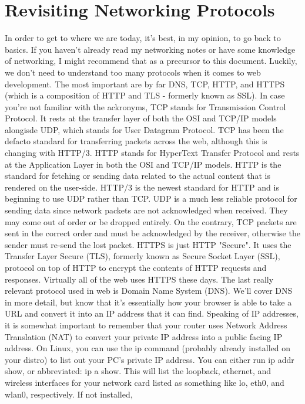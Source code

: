 \documentclass{article}
\begin{document}
\section{Revisiting Networking Protocols}

In order to get to where we are today, it's best, in my opinion, to go back to basics. If you haven't already
read my networking notes or have some knowledge of networking, I might recommend that as a precursor to this
document. Luckily, we don't need to understand too many protocols when it comes to web development. The most
important are by far DNS, TCP, HTTP, and HTTPS (which is a composition of HTTP and TLS - formerly known as SSL).
In case you're not familiar with the ackronyms, TCP stands for Transmission Control Protocol. It rests at the
transfer layer of both the OSI and TCP/IP models alongisde UDP, which stands for User Datagram Protocol. TCP
has been the defacto standard for transferring packets across the web, although this is changing with HTTP/3.
HTTP stands for HyperText Transfer Protocol and rests at the Application Layer in both the OSI and TCP/IP
models. HTTP is the standard for fetching or sending data related to the actual content that is rendered on the
user-side. HTTP/3 is the newest standard for HTTP and is beginning to use UDP rather than TCP. UDP is a much
less reliable protocol for sending data since network packets are not acknowledged when received. They may come
out of order or be dropped entirely. On the contrary, TCP packets are sent in the correct order and must be
acknowledged by the receiver, otherwise the sender must re-send the lost packet. HTTPS is just HTTP "Secure".
It uses the Transfer Layer Secure (TLS), formerly known as Secure Socket Layer (SSL), protocol on top of HTTP
to encrypt the contents of HTTP requests and responses. Virtually all of the web uses HTTPS these days. The
last really relevant protocol used in web is Domain Name System (DNS). We'll cover DNS in more detail, but know
that it's essentially how your browser is able to take a URL and convert it into an IP address that it can
find. Speaking of IP addresses, it is somewhat important to remember that your router uses Network Address
Translation (NAT) to convert your private IP address into a public facing IP address. On Linux, you can use the
ip command (probably already installed on your distro) to list out your PC's private IP address. You can
either run ip addr show, or abbreviated: ip a show. This will list the loopback, ethernet, and wireless
interfaces for your network card listed as something like lo, eth0, and wlan0, respectively. If not installed,
\end{document}
